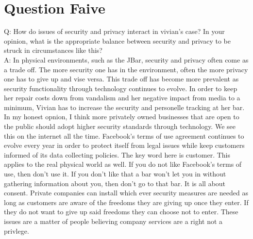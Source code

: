 \documentclass[paper=a4, fontsize=11pt]{scrartcl} %
\numberwithin{equation}{section} %
\numberwithin{figure}{section} %
\numberwithin{table}{section} %
\begin{document}

\section{Question Faive}

Q: How do issues of security and privacy interact in vivian's case? In your opinion, what is the appropriate balance between 
security and privacy to be struck in circumstances like this?\\

A: In physical environments, such as the JBar, security and privacy often come as a trade off. The more security one has
in the environment, often the more privacy one has to give up and vise versa. This trade off has become more prevalent as security
functionality through technology continues to evolve. In order to keep her repair costs down from vandalism and her negative
impact from media to a minimum, Vivian has to increase the security and personelle tracking at her bar. In my honest opnion,
I think more privately owned businesses that are open to the public should adopt higher security standards through technology.
We see this on the internet all the time. Facebook's terms of use agreement continues to evolve every year in order to protect
itself from legal issues while keep customers informed of its data collecting policies. The key word here is customer. This
applies to the real physical world as well. If you do not like Facebook's terms of use, then don't use it. If you don't like
that a bar won't let you in without gathering information about you, then don't go to that bar. It is all about consent. 
Private companies can install which ever security measures are needed as long as customers are aware of the freedoms they
are giving up once they enter. If they do not want to give up said freedoms they can choose not to enter. These issues are
a matter of people believing company services are a right not a privlege.


\end{document}

